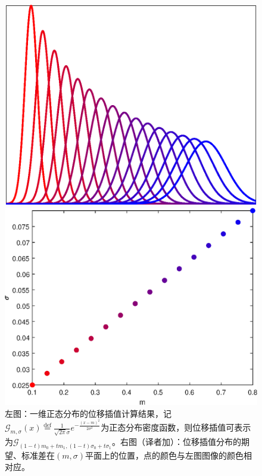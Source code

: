 \documentclass[cn,10pt,math=newtx,citestyle=gb7714-2015,bibstyle=gb7714-2015]{elegantbook}
\begin{document}
\begin{figure}[H]
	\centering
	\begin{minipage}{0.45\linewidth}
		\centering
		\includegraphics[width=0.8\linewidth]{figure/fig2.14/interp-density.eps}
	\end{minipage}
	\begin{minipage}{0.45\linewidth}
		\centering
		\includegraphics[width=0.8\linewidth]{figure/fig2.14/plane.eps}
	\end{minipage}
	\vspace{1em}
	\caption{左图：一维正态分布的位移插值计算结果，记$\mathcal{G}_{m,\sigma}(x)\overset{\text{def}}{=}\frac{1}{\sqrt{2\pi}\sigma}e^{-\frac{(x-m)^2}{2\sigma^2}}$为正态分布密度函数，则位移插值可表示为$\mathcal{G}_{(1-t)m_0+tm_1,(1-t)\sigma_0+t\sigma_1}$。右图（译者加）：位移插值分布的期望、标准差在$(m,\sigma)$平面上的位置，点的颜色与左图图像的颜色相对应。}
	\label{图2.14}
\end{figure}
\end{document}
